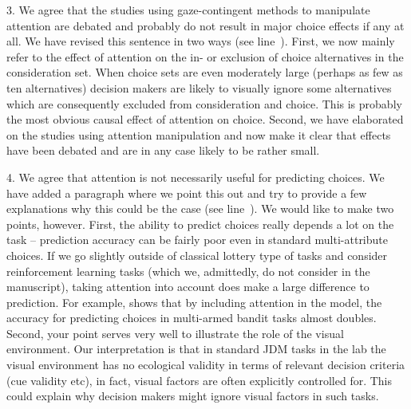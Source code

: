 3. We agree that the studies using gaze-contingent methods to manipulate attention are debated and probably do not result in major choice effects if any at all. We have revised this sentence in two ways (see line~). First, we now mainly refer to the effect of attention on the in- or exclusion of choice alternatives in the consideration set. When choice sets are even moderately large (perhaps as few as ten alternatives) decision makers are likely to visually ignore some alternatives which are consequently excluded from consideration and choice. This is probably the most obvious causal effect of attention on choice. Second, we have elaborated on the studies using attention manipulation and now make it clear that effects have been debated and are in any case likely to be rather small. 

4. We agree that attention is not necessarily useful for predicting choices. We have added a paragraph where we point this out and try to provide a few explanations why this could be the case (see line~). We would like to make two points, however. First, the ability to predict choices really depends a lot on the task -- prediction accuracy can be fairly poor even in standard multi-attribute choices. If we go slightly outside of classical lottery type of tasks and consider reinforcement learning tasks (which we, admittedly, do not consider in the manuscript), taking attention into account does make a large difference to prediction. For example, \cite{stojic2020uncertainty} shows that by including attention in the model, the accuracy for predicting choices in multi-armed bandit tasks almost doubles. Second, your point serves very well to illustrate the role of the visual environment. Our interpretation is that in standard JDM tasks in the lab the visual environment has no ecological validity in terms of relevant decision criteria (cue validity etc), in fact, visual factors are often explicitly controlled for. This could explain why decision makers might ignore visual factors in such tasks. \\


